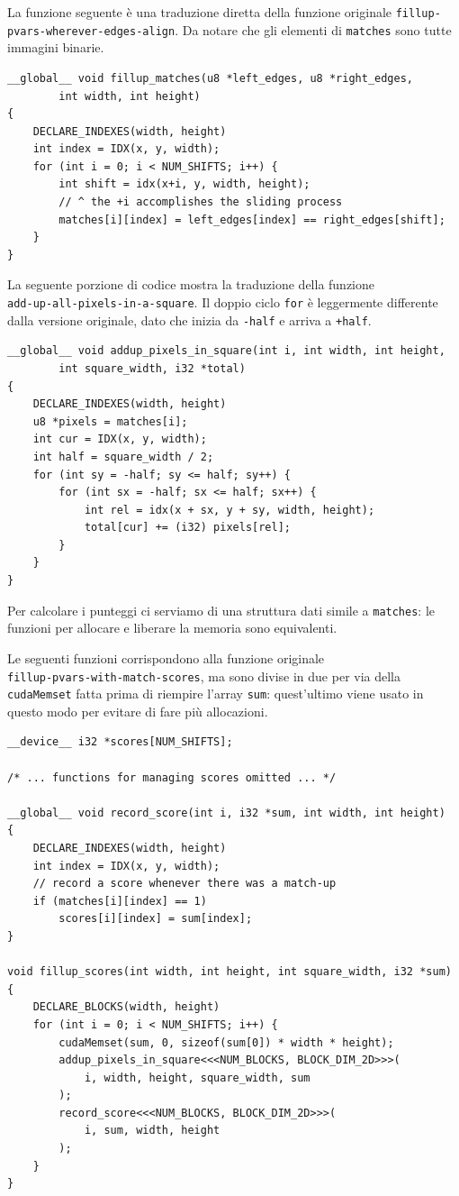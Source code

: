 \documentclass[12pt,a4paper,openright,twoside]{report}
\begin{document}
La funzione seguente è una traduzione diretta della funzione originale \verb|fillup-pvars-wherever-edges-align|. Da notare che gli elementi di \verb|matches| sono tutte immagini binarie.

\begin{lstlisting}[style=mystyle]
__global__ void fillup_matches(u8 *left_edges, u8 *right_edges,
        int width, int height)
{
    DECLARE_INDEXES(width, height)
    int index = IDX(x, y, width);
    for (int i = 0; i < NUM_SHIFTS; i++) {
        int shift = idx(x+i, y, width, height);
        // ^ the +i accomplishes the sliding process
        matches[i][index] = left_edges[index] == right_edges[shift];
    }
}
\end{lstlisting}

La seguente porzione di codice mostra la traduzione della funzione \\ \verb|add-up-all-pixels-in-a-square|. Il doppio ciclo \verb|for| è leggermente differente dalla versione originale, dato che inizia da \verb|-half| e arriva a \verb|+half|.

\begin{lstlisting}[style=mystyle]
__global__ void addup_pixels_in_square(int i, int width, int height,
        int square_width, i32 *total)
{
    DECLARE_INDEXES(width, height)
    u8 *pixels = matches[i];
    int cur = IDX(x, y, width);
    int half = square_width / 2;
    for (int sy = -half; sy <= half; sy++) {
        for (int sx = -half; sx <= half; sx++) {
            int rel = idx(x + sx, y + sy, width, height);
            total[cur] += (i32) pixels[rel];
        }
    }
}
\end{lstlisting}

Per calcolare i punteggi ci serviamo di una struttura dati simile a \verb|matches|: le funzioni per allocare e liberare la memoria sono equivalenti.

Le seguenti funzioni corrispondono alla funzione originale \\ \verb|fillup-pvars-with-match-scores|, ma sono divise in due per via della \verb|cudaMemset| fatta prima di riempire l'array \verb|sum|: quest'ultimo viene usato in questo modo per evitare di fare più allocazioni.

\begin{lstlisting}[style=mystyle]
__device__ i32 *scores[NUM_SHIFTS];

/* ... functions for managing scores omitted ... */

__global__ void record_score(int i, i32 *sum, int width, int height)
{
    DECLARE_INDEXES(width, height)
    int index = IDX(x, y, width);
    // record a score whenever there was a match-up
    if (matches[i][index] == 1)
        scores[i][index] = sum[index];
}

void fillup_scores(int width, int height, int square_width, i32 *sum)
{
    DECLARE_BLOCKS(width, height)
    for (int i = 0; i < NUM_SHIFTS; i++) {
        cudaMemset(sum, 0, sizeof(sum[0]) * width * height);
        addup_pixels_in_square<<<NUM_BLOCKS, BLOCK_DIM_2D>>>(
            i, width, height, square_width, sum
        );
        record_score<<<NUM_BLOCKS, BLOCK_DIM_2D>>>(
            i, sum, width, height
        );
    }
}
\end{lstlisting}
\end{document}
